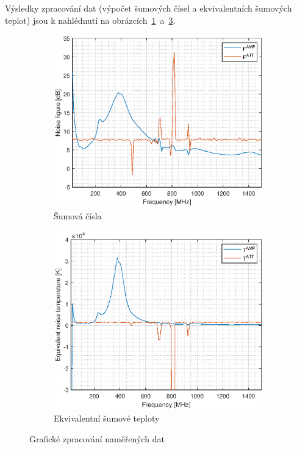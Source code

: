 \documentclass[11pt,a4paper]{article}
\begin{document}
Výsledky zpracování dat (výpočet šumových čísel a ekvivalentních šumových teplot) jsou k nahlédnutí na obrázcích~\ref{fig:task2-figures}~a~\ref{fig:task2-temperatures}.
\begin{figure}[!ht]
    \centering
    \begin{subfigure}{.45\textwidth}
        \centering
        \includegraphics[width=\textwidth]{src/task2-figures.eps}
        \caption{Šumová čísla}
        \label{fig:task2-figures}
    \end{subfigure}
    \begin{subfigure}{.45\textwidth}
        \centering
        \includegraphics[width=\textwidth]{src/task2-temperatures.eps}
        \caption{Ekvivalentní šumové teploty}
        \label{fig:task2-temperatures}
    \end{subfigure}
    \caption{Grafické zpracování naměřených dat}
\end{figure}
\end{document}
